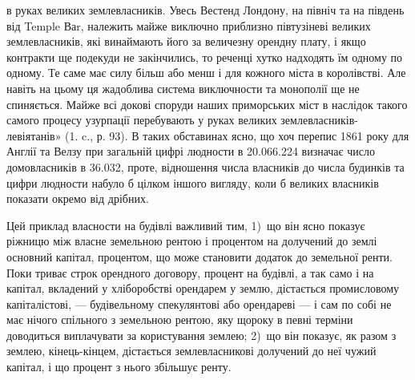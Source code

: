\parcont{}  %
в руках великих землевласників. Увесь Вестенд Лондону, на північ та на південь
від Temple Ваr, належить майже виключно приблизно півтузіневі великих
землевласників, які винаймають його за величезну орендну плату, і якщо
контракти ще подекуди не закінчились, то реченці хутко надходять їм одному по
одному. Те саме має силу більш або менш і для кожного міста в королівстві. Але
навіть на цьому ця жадоблива система виключности та монополії ще не спиняється. Майже всі докові
споруди наших приморських міст в наслідок такого
самого процесу узурпації перебувають у руках великих землевласників-левіятанів» (1. c., р. 93). В
таких обставинах ясно, що хоч перепис 1861 року для
Англії та Велзу при загальній цифрі людности в \num{20.066.224} визначає число
домовласників в \num{36.032}, проте, відношення числа власників до числа будинків
та цифри людности набуло б цілком іншого вигляду, коли б великих власників
показати окремо від дрібних.
\enablefootnotebreak{}

Цей приклад власности на будівлі важливий тим, 1)~що він ясно показує
ріжницю між власне земельною рентою і процентом на долучений до землі
основний капітал, процентом, що може становити додаток до земельної ренти.
Поки триває строк орендного договору, процент на будівлі, а так само і на
капітал, вкладений у хліборобстві орендарем у землю, дістається промисловому капіталістові, —
будівельному спекулянтові або орендареві — і сам по собі
не має нічого спільного з земельною рентою, яку щороку в певні терміни доводиться виплачувати за
користування землею; 2)~що він показує, як разом з
землею, кінець-кінцем, дістається землевласникові долучений до неї чужий капітал, і що процент з
нього збільшує ренту.

